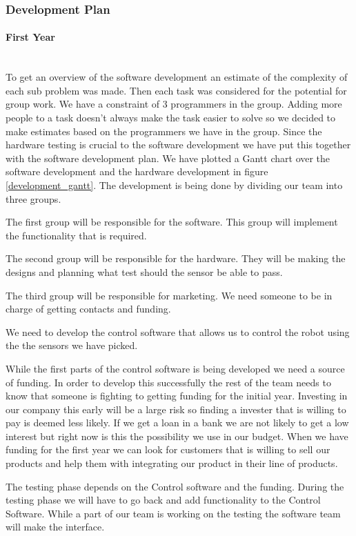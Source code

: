 \subsubsection{Development Plan}
\paragraph*{First Year}~\\
To get an overview of the software development an estimate of the complexity of each sub problem was made.
Then each task was considered for the potential for group work.
We have a constraint of 3 programmers in the group.
Adding more people to a task doesn't always make the task easier to solve so we decided to make estimates based on the programmers we have in the group.
Since the hardware testing is crucial to the software development we have put this together with the software development plan. 
We have plotted a Gantt chart over the software development and the hardware development in figure \ref{development_gantt}.
The development is being done by dividing our team into three groups. 

The first group will be responsible for the software. 
This group will implement the functionality that is required.

The second group will be responsible for the hardware. 
They will be making the designs and planning what test should the sensor be able to pass.

The third group will be responsible for marketing. 
We need someone to be in charge of getting contacts and funding. 

We need to develop the control software that allows us to control the robot using the the sensors we have picked. 

While the first parts of the control software is being developed we need a source of funding.
In order to develop this successfully the rest of the team needs to know that someone is fighting to getting funding for the initial year.
Investing in our company this early will be a large risk so finding a invester that is willing to pay is deemed less likely. 
If we get a loan in a bank we are not likely to get a low interest but right now is this the possibility we use in our budget.
When we have funding for the first year we can look for customers that is willing to sell our products and help them with integrating our product in their line of products.

The testing phase depends on the Control software and the funding. 
During the testing phase we will have to go back and add functionality to the Control Software. 
While a part of our team is working on the testing the software team will make the interface.

